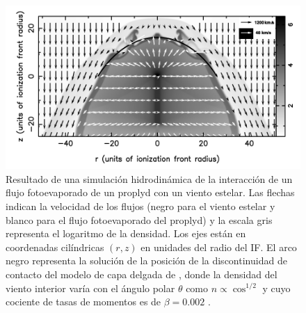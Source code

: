 \begin{figure}
  \centering
  \includegraphics[width=0.7\linewidth]{./Figures/GA-simulation}
  \caption{Resultado de una simulación hidrodinámica de la interacción de un flujo fotoevaporado de un proplyd con un viento estelar. Las flechas indican la velocidad de los flujos (negro para el viento estelar y blanco para el flujo fotoevaporado del proplyd) y la escala gris representa el logaritmo de la densidad. Los ejes están en coordenadas cilíndricas $(r, z)$ en unidades del radio del IF. El arco negro representa la solución de la posición de la discontinuidad de contacto del modelo de capa delgada de \citet{Canto:1996}, donde la densidad del viento interior varía con el ángulo polar $\theta$ como $n\propto \cos^{1/2}$ y cuyo cociente de tasas de momentos es de $\beta=0.002$ \citep{Garcia-Arredondo:2001}.}
  \label{fig:GA-simulation}
\end{figure}


